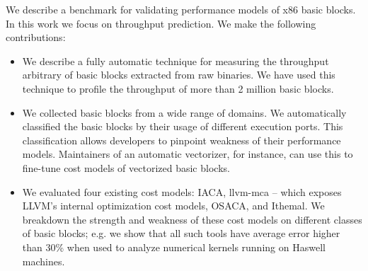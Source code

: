 We describe a benchmark for validating performance models
of x86 basic blocks.
In this work we focus on throughput prediction.
We make the following contributions:
\begin{itemize}
\item We describe a fully automatic technique
for measuring the throughput arbitrary of basic blocks extracted 
from raw binaries.
We have used this technique to profile the throughput of more than 2 million basic blocks.

\item We collected basic blocks from a wide range of domains.
We automatically classified the basic blocks
by their usage of different execution ports.
This classification allows developers to pinpoint weakness
of their performance models.
Maintainers of an automatic vectorizer, for instance,
can use this to fine-tune cost models
of vectorized basic blocks.

\item We evaluated four existing cost models:
IACA, llvm-mca -- 
which exposes LLVM’s internal optimization cost models,
OSACA\cite{osaca}, and Ithemal\cite{ithemal}.
We breakdown the strength and weakness of these cost models on
different classes of basic blocks;
e.g. we show that all such tools
have average error higher than 30\% 
when used to analyze numerical kernels running on Haswell machines.

\end{itemize}